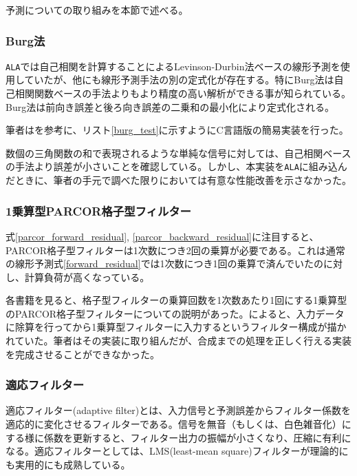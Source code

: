 \documentclass[uplatex,dvipdfmx,b5j,10pt]{jsbook}
\theoremstyle{definition}
\begin{document}
予測についての取り組みを本節で述べる。

\subsubsection{Burg法}

\texttt{ALA}では自己相関を計算することによるLevinson-Durbin法ベースの線形予測を使用していたが、他にも線形予測手法の別の定式化が存在する。特にBurg法は自己相関関数ベースの手法よりもより精度の高い解析ができる\cite{burgcomp}事が知られている。Burg法は前向き誤差と後ろ向き誤差の二乗和の最小化により定式化される。

筆者は\cite{burgimpl}を参考に、リスト\ref{burg_test}に示すようにC言語版の簡易実装を行った。



数個の三角関数の和で表現されるような単純な信号に対しては、自己相関ベースの手法より誤差が小さいことを確認している。しかし、本実装を\texttt{ALA}に組み込んだときに、筆者の手元で調べた限りにおいては有意な性能改善を示さなかった。

\subsubsection{1乗算型PARCOR格子型フィルター}

式\ref{parcor_forward_residual}, \ref{parcor_backward_residual}に注目すると、PARCOR格子型フィルターは1次数につき2回の乗算が必要である。これは通常の線形予測式\ref{forward_residual}では1次数につき1回の乗算で済んでいたのに対し、計算負荷が高くなっている。

各書籍\cite{sounddsp2nd, linearpredict}を見ると、格子型フィルターの乗算回数を1次数あたり1回にする1乗算型のPARCOR格子型フィルターについての説明があった。\cite{sounddsp2nd, linearpredict}によると、入力データに除算を行ってから1乗算型フィルターに入力するというフィルター構成が描かれていた。筆者はその実装に取り組んだが、合成までの処理を正しく行える実装を完成させることができなかった。

\subsubsection{適応フィルター}

適応フィルター(adaptive filter)とは、入力信号と予測誤差からフィルター係数を適応的に変化させるフィルターである。信号を無音（もしくは、白色雑音化）にする様に係数を更新すると、フィルター出力の振幅が小さくなり、圧縮に有利になる。適応フィルターとしては、LMS(least-mean square)フィルターが理論的にも実用的にも成熟している\cite{adaptivealgo}。
\end{document}

